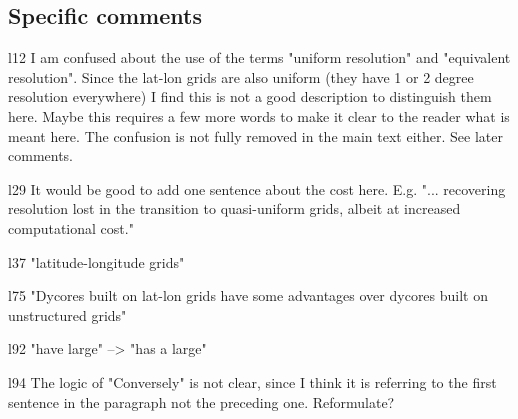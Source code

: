 \documentclass[12pt,oneside,a4paper]{article}%
\begin{document}
\subsection*{Specific comments}

l12 I am confused about the use of the terms "uniform resolution" and "equivalent resolution". Since the lat-lon grids are also uniform (they have 1 or 2 degree resolution everywhere) I find this is not a good description to distinguish them here. Maybe this requires a few more words to make it clear to the reader what is meant here. The confusion is not fully removed in the main text either. See later comments.\newline

{\color{blue}{We take your point and agree that this is confusing. To clarify this, we've replaced ``uniform resolution" with ``quasi-uniform unstructured grids" and clarify that ``uniform" refers to isotropic grids where every grid cell has the same length in meters, as opposed to an angular distance in spherical coordinates. Whereas we had previously used ``uniform grids" to refer to both lat-lon and quasi-uniform unstructured grids, we replace ``uniform" with ``lat-lon and quasi-uniform grids" throughout the manuscript, to be more explicit about the differences between the SE and lat-lon grids.}} \newline

l29 It would be good to add one sentence about the cost here. E.g. "... recovering resolution lost in the transition to quasi-uniform grids, albeit at increased computational cost." \newline

{\color{blue}{Done.}} \newline

l37 "latitude-longitude grids" \newline

{\color{blue}{Done.}} \newline

l75 "Dycores built on lat-lon grids have some advantages over dycores built on unstructured grids" \newline

{\color{blue}{Done.}} \newline

l92 "have large" --> "has a large" \newline

{\color{blue}{Done.}} \newline

l94 The logic of "Conversely" is not clear, since I think it is referring to the first sentence in the paragraph not the preceding one. Reformulate? \newline
\end{document}
